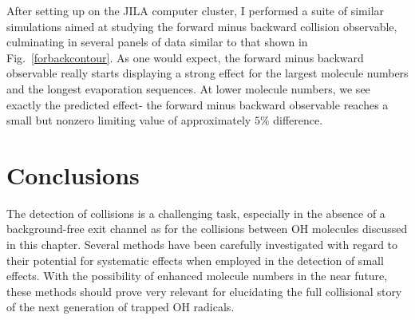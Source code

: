 After setting up on the JILA computer cluster, I performed a suite of similar simulations aimed at studying the forward minus backward collision observable, culminating in several panels of data similar to that shown in Fig.~\ref{forbackcontour}.
As one would expect, the forward minus backward observable really starts displaying a strong effect for the largest molecule numbers and the longest evaporation sequences.
At lower molecule numbers, we see exactly the predicted effect- the forward minus backward observable reaches a small but nonzero limiting value of approximately $5\%$ difference.

\section{Conclusions}

The detection of collisions is a challenging task, especially in the absence of a background-free exit channel as for the collisions between OH molecules discussed in this chapter.
Several methods have been carefully investigated with regard to their potential for systematic effects when employed in the detection of small effects.
With the possibility of enhanced molecule numbers in the near future, these methods should prove very relevant for elucidating the full collisional story of the next generation of trapped OH radicals.


\ifx\justbeingincluded\undefined

\fi
